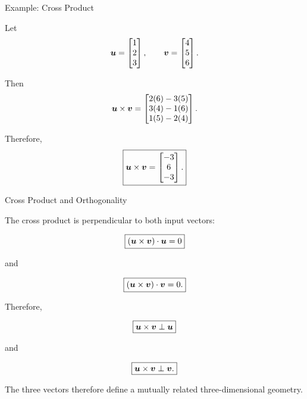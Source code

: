 
\begin{frame}{Example: Cross Product}

Let
\vspace{-0.1cm}
\[
\bm{u}
=
\begin{bmatrix}
1\\2\\3
\end{bmatrix},
\qquad
\bm{v}
=
\begin{bmatrix}
4\\5\\6
\end{bmatrix}.
\]

Then
\vspace{-0.1cm}
\[
\bm{u}\times\bm{v}
=
\begin{bmatrix}
2(6)-3(5)\\
3(4)-1(6)\\
1(5)-2(4)
\end{bmatrix}.
\]

Therefore,
\vspace{-0.1cm}
\[
\boxed{
\bm{u}\times\bm{v}
=
\begin{bmatrix}
-3\\6\\-3
\end{bmatrix}.
}
\]

\end{frame}



\begin{frame}{Cross Product and Orthogonality}

The cross product is perpendicular to both input vectors:

\[
\boxed{
(\bm{u}\times\bm{v})\cdot\bm{u}=0
}
\]

and

\[
\boxed{
(\bm{u}\times\bm{v})\cdot\bm{v}=0.
}
\]

Therefore,

\[
\boxed{
\bm{u}\times\bm{v}
\perp
\bm{u}
}
\]

and

\[
\boxed{
\bm{u}\times\bm{v}
\perp
\bm{v}.
}
\]

The three vectors therefore define a mutually related
three-dimensional geometry.

\end{frame}


